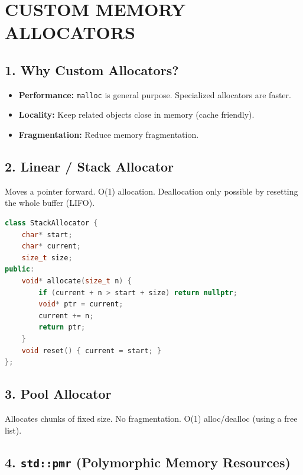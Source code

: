\hypertarget{custom-memory-allocators}{%
\chapter{CUSTOM MEMORY ALLOCATORS}\label{custom-memory-allocators}}

\hypertarget{why-custom-allocators}{%
\section{1. Why Custom Allocators?}\label{why-custom-allocators}}

\begin{itemize}
\tightlist
\item
  \textbf{Performance:} \passthrough{\lstinline!malloc!} is general
  purpose. Specialized allocators are faster.
\item
  \textbf{Locality:} Keep related objects close in memory (cache
  friendly).
\item
  \textbf{Fragmentation:} Reduce memory fragmentation.
\end{itemize}

\hypertarget{linear-stack-allocator}{%
\section{2. Linear / Stack Allocator}\label{linear-stack-allocator}}

Moves a pointer forward. O(1) allocation. Deallocation only possible by
resetting the whole buffer (LIFO).

\begin{lstlisting}[language={C++}]
class StackAllocator {
    char* start;
    char* current;
    size_t size;
public:
    void* allocate(size_t n) {
        if (current + n > start + size) return nullptr;
        void* ptr = current;
        current += n;
        return ptr;
    }
    void reset() { current = start; }
};
\end{lstlisting}

\hypertarget{pool-allocator}{%
\section{3. Pool Allocator}\label{pool-allocator}}

Allocates chunks of fixed size. No fragmentation. O(1) alloc/dealloc
(using a free list).

\hypertarget{stdpmr-polymorphic-memory-resources}{%
\section{\texorpdfstring{4. \texttt{std::pmr} (Polymorphic Memory
Resources)}{4. std::pmr (Polymorphic Memory Resources)}}\label{stdpmr-polymorphic-memory-resources}}

